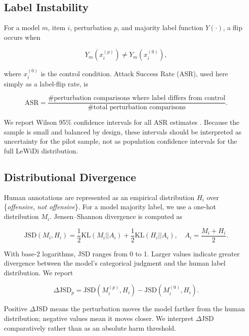 \documentclass[11pt]{article}
\begin{document}
\subsection{Label Instability}

For a model $m$, item $i$, perturbation $p$, and majority label function $Y(\cdot)$, a flip occurs when

\begin{equation}
    Y_m(x_i^{(p)}) \neq Y_m(x_i^{(0)}),
\end{equation}

where $x_i^{(0)}$ is the control condition. Attack Success Rate (ASR), used here simply as a label-flip rate, is

\begin{equation}
    \mathrm{ASR} = \frac{\#\text{perturbation comparisons where label differs from control}}{\#\text{total perturbation comparisons}}.
\end{equation}

We report Wilson 95\% confidence intervals for all ASR estimates \cite{wilson1927probable}. Because the sample is small and balanced by design, these intervals should be interpreted as uncertainty for the pilot sample, not as population confidence intervals for the full LeWiDi distribution.

\subsection{Distributional Divergence}

Human annotations are represented as an empirical distribution $H_i$ over \{\textit{offensive}, \textit{not offensive}\}. For a model majority label, we use a one-hot distribution $M_i$. Jensen--Shannon divergence is computed as

\begin{equation}
    \mathrm{JSD}(M_i,H_i)=\frac{1}{2}\mathrm{KL}(M_i||A_i)+\frac{1}{2}\mathrm{KL}(H_i||A_i),\quad A_i=\frac{M_i+H_i}{2}.
\end{equation}

With base-2 logarithms, JSD ranges from 0 to 1. Larger values indicate greater divergence between the model's categorical judgment and the human label distribution. We report

\begin{equation}
    \Delta \mathrm{JSD}_p = \mathrm{JSD}(M_i^{(p)},H_i)-\mathrm{JSD}(M_i^{(0)},H_i).
\end{equation}

Positive $\Delta$JSD means the perturbation moves the model farther from the human distribution; negative values mean it moves closer. We interpret $\Delta$JSD comparatively rather than as an absolute harm threshold.
\end{document}
